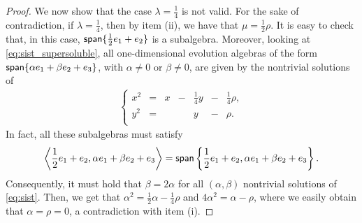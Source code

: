 \documentclass[12pt,reqno]{amsart}
\theoremstyle{plain}%
\theoremstyle{definition}
\theoremstyle{remark}
\DeclareMathOperator{\spa}{\textup{\textsf{span}}}
\numberwithin{equation}{section}
\begin{document}
\begin{proof}
We now show that the case $\lambda=\frac{1}{4}$ is not valid. For the sake of contradiction, if $\lambda=\frac{1}{4}$, then by item (ii), we have that $\mu=\frac{1}{2}\rho$. It is easy to check that, in this case, $\spa\{\frac{1}{2}e_1+e_2\}$ is a subalgebra. Moreover, looking at \eqref{eq:sist_supersoluble}, all one-dimensional evolution algebras of the form $\spa\{\alpha e_1+\beta e_2+e_3\}$, with $\alpha\neq0$ or $\beta\neq0$, are given by the nontrivial solutions of  
\begin{align}\label{eq:sist}
	\left\{
		\begin{array}{ccccccc}
			x^2&=&x&-&\frac{1}{4} y&-&\frac{1}{4}\rho,\\
			y^2&=&&&y&-&\rho.\\
		\end{array}
		\right.
\end{align}
In fact, all these subalgebras must satisfy
\[\left\langle\frac{1}{2}e_1+e_2,\alpha e_1+\beta e_2+e_3\right\rangle=\spa\left\{\frac{1}{2}e_1+e_2,\alpha e_1+\beta e_2+e_3\right\}.\]
Consequently, it must hold that $\beta=2\alpha$ for all $(\alpha,\beta)$ nontrivial solutions of \eqref{eq:sist}. Then, we get that $\alpha^2=\frac{1}{2}\alpha-\frac{1}{4}\rho$ and $4\alpha^2=\alpha-\rho$, where we easily obtain that $\alpha=\rho=0$, a contradiction with item (i). 
\end{proof}
\end{document}

